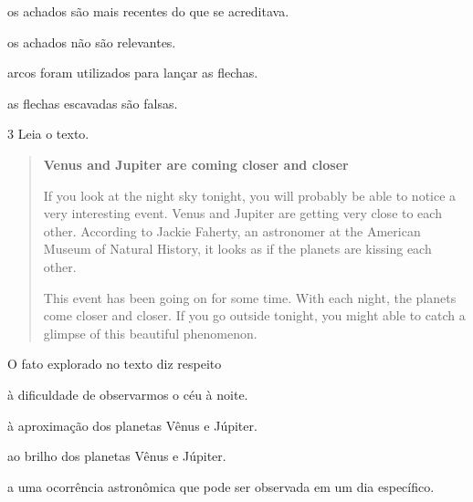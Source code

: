 \begin{escolha}
\item os achados são mais recentes do que se acreditava.

\item os achados não são relevantes.

\item arcos foram utilizados para lançar as flechas.

\item as flechas escavadas são falsas.
\end{escolha}


\num{3} Leia o texto.

\begin{quote}
\textbf{Venus and Jupiter are coming closer and closer}

If you look at the night sky tonight, you will probably be able to notice a very interesting event. Venus and Jupiter are getting very close to each other. According to Jackie Faherty, an astronomer at the American Museum of Natural History, it looks as if the planets are kissing each other.

This event has been going on for some time. With each night, the planets come closer and closer. If you go outside tonight, you might able to catch a glimpse of this beautiful phenomenon. 

\end{quote}

O fato explorado no texto diz respeito

\begin{escolha}
\item à dificuldade de observarmos o céu à noite.

\item à aproximação dos planetas Vênus e Júpiter.

\item ao brilho dos planetas Vênus e Júpiter.

\item a uma ocorrência astronômica que pode ser observada em um dia específico.
\end{escolha}

